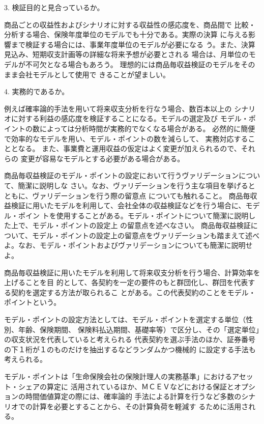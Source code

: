 \documentclass[report,gutter=10mm,fore-edge=10mm,uplatex,dvipdfmx]{jlreq}
\begin{document}
3. 検証目的と見合っているか。

商品ごとの収益性およびシナリオに対する収益性の感応度を、商品間で
比較・分析する場合、保険年度単位のモデルでも十分である。実際の決算
に与える影響まで検証する場合には、事業年度単位のモデルが必要になる
う。また、決算見込み、短期収支計画等の詳細な将来予想が必要とされる
場合は、月単位のモデルが不可欠となる場合もあろう。
理想的には商品毎収益検証のモデルをそのまま会社モデルとして使用で
きることが望ましい。

4. 実務的であるか。

例えば確率論的手法を用いて将来収支分析を行なう場合、数百本以上の
シナリオに対する利益の感応度を検証することになる。モデルの選定及び
モデル・ポイントの数によっては分析時間が実務的でなくなる場合がある。
必然的に簡便で効率的なモデルを用い、モデル・ポイントの数を減らして、
実務対応することとなる。
また、事業費と運用収益の仮定はよく変更が加えられるので、それらの
変更が容易なモデルとする必要がある場合がある。

商品毎収益検証のモデル・ポイントの設定において行うヴァリデーションについて、簡潔に説明しな
さい。なお、ヴァリデーションを行う主な項目を挙げるとともに、ヴァリデーションを行う際の留意点
についても触れること。
商品毎収益検証に用いたモデルを利用して、会社全体の収益検証などを行う場合に、モデル・ポイン
トを使用することがある。モデル・ポイントについて簡潔に説明した上で、モデル・ポイントの設定上
の留意点を述べなさい。
商品毎収益検証について、モデル・ポイントの設定上の留意点をヴァリデーションも踏まえて述べ
よ。なお、モデル・ポイントおよびヴァリデーションについても簡潔に説明せよ。

\answer{}
商品毎収益検証に用いたモデルを利用して将来収支分析を行う場合、計算効率を上げることを目
的として、各契約を一定の要件のもと群団化し、群団を代表する契約を選定する方法が取られるこ
とがある。この代表契約のことをモデル・ポイントという。

モデル・ポイントの設定方法としては、モデル・ポイントを選定する単位（性別、年齢、保険期間、
保険料払込期間、基礎率等）で区分し、その「選定単位」の収支状況を代表していると考えられる
代表契約を選ぶ手法のほか、証券番号の下１桁が１のものだけを抽出するなどランダムかつ機械的
に設定する手法も考えられる。

モデル・ポイントは「生命保険会社の保険計理人の実務基準」におけるアセット・シェアの算定に
活用されているほか、ＭＣＥＶなどにおける保証とオプションの時間価値算定の際には、確率論的
手法による計算を行うなど多数のシナリオでの計算を必要とすることから、その計算負荷を軽減す
るために活用される。
\end{document}
